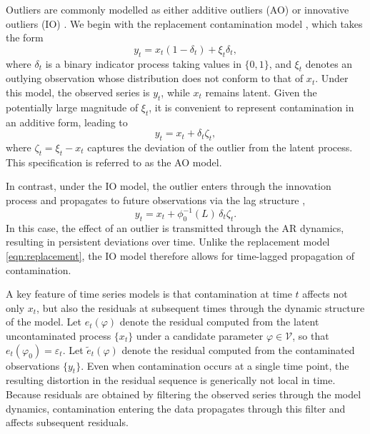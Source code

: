 \documentclass[12pt]{article}
\numberwithin{equation}{section}
\begin{document}
Outliers are commonly modelled as either additive outliers (AO) or innovative outliers (IO) \citep{fox_outliers_1972, AbrahamBox1979, chang_estimation_1988}.
We begin with the replacement contamination model \citep{denby_robust_1979, bustos_robust_1986, MaYo86}, which takes the form
\begin{equation} \label{eqn:replacement}
y_t = x_t (1 - \delta_t) + \xi_t \delta_t,
\end{equation}
where $\delta_t$ is a binary indicator process taking values in $\{0,1\}$,
and $\xi_t$ denotes an outlying observation whose distribution does not conform to that of $x_t$.
Under this model, the observed series is $y_t$, while $x_t$ remains latent. Given the potentially large magnitude of $\xi_t$, it is convenient to represent contamination in an additive form, leading to
\begin{equation} \label{eqn:additive_outlier}
y_t = x_t + \delta_t \zeta_t,
\end{equation}
where $\zeta_t = \xi_t - x_t$ captures the deviation of the outlier from the latent process.
This specification is referred to as the AO model.

In contrast, under the IO model, the outlier enters through the innovation process and propagates to future observations via the lag structure \citep{fox_outliers_1972, chang_estimation_1988},
\begin{equation} \label{eqn:innovative_outlier}
y_t = x_t + \phi_0^{-1}(L)\,\delta_t \zeta_t.
\end{equation}
In this case, the effect of an outlier is transmitted through the AR dynamics, resulting in persistent deviations over time. Unlike the replacement model \eqref{eqn:replacement}, the IO model therefore allows for time-lagged propagation of contamination.

A key feature of time series models is that contamination at time $t$ affects not only $x_t$, but also the residuals at subsequent times through the dynamic structure of the model.
Let $e_t(\varphi)$ denote the residual computed from the latent uncontaminated process $\{x_t\}$ under a candidate parameter $\varphi \in \mathcal{V}$, so that $e_t(\varphi_0)=\varepsilon_t$.
Let $\tilde e_t(\varphi)$ denote the residual computed from the contaminated observations $\{y_t\}$.
Even when contamination occurs at a single time point, 
the resulting distortion in the residual sequence is generically not local in time.
Because residuals are obtained by filtering the observed series through the model dynamics, contamination entering the data propagates through this filter and affects subsequent residuals.
\end{document}
